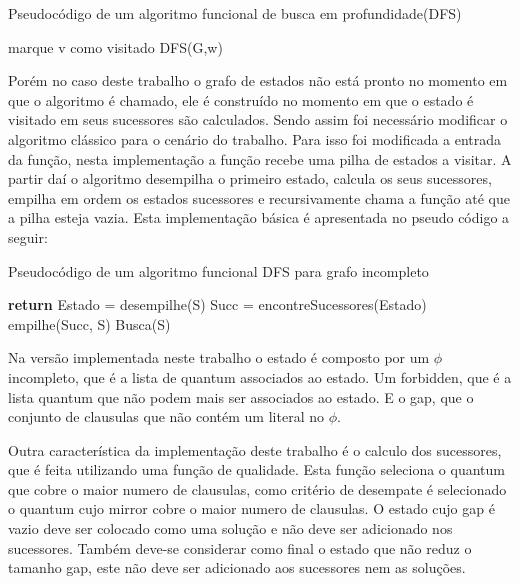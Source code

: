 \documentclass{ufsc-thesis}
\begin{document}
\begin{algorithm}
\caption{Pseudocódigo de um algoritmo funcional de busca em profundidade(DFS)} \label{alg:dfs}
\begin{algorithmic}[1]
\State marque v como visitado
    \State DFS(G,w)
  \EndIf
\EndFor
\EndProcedure
\end{algorithmic}
\end{algorithm}

Porém no caso deste trabalho o grafo de estados não está pronto no momento em que o algoritmo é chamado,
ele é construído no momento em que o estado é visitado em seus sucessores são calculados. Sendo assim 
foi necessário modificar o algoritmo clássico para o cenário do trabalho. Para isso foi modificada a 
entrada da função, nesta implementação a função recebe uma pilha de estados a visitar. A partir daí 
o algoritmo desempilha o primeiro estado, calcula os seus sucessores, empilha em ordem os estados 
sucessores e recursivamente chama a função até que a pilha esteja vazia. Esta implementação básica 
é apresentada no pseudo código a seguir:

\begin{algorithm}
\caption{Pseudocódigo de um algoritmo funcional DFS para grafo incompleto} \label{alg:dfs-incomplete}
\begin{algorithmic}[1]
\State \textbf{return}
\Else
  \State Estado = desempilhe(S)
  \State Succ = encontreSucessores(Estado)
  \State empilhe(Succ, S)
  \State Busca(S)
\EndIf
\EndProcedure
\end{algorithmic}
\end{algorithm}

Na versão implementada neste trabalho o estado é composto por um $\phi$ incompleto, que é a lista 
de quantum associados ao estado. Um forbidden, que é a lista quantum que não podem mais ser associados 
ao estado. E o gap, que o conjunto de clausulas que não contém um literal no $\phi$.

Outra característica da implementação deste trabalho é o calculo dos sucessores, que é feita utilizando 
uma função de qualidade. Esta função seleciona o quantum que cobre o maior numero de clausulas, como 
critério de desempate é selecionado o quantum cujo mirror cobre o maior numero de clausulas. O estado cujo 
gap é vazio deve ser colocado como uma solução e não deve ser adicionado nos sucessores. Também deve-se 
considerar como final o estado que não reduz o tamanho gap, este não deve ser adicionado aos sucessores 
nem as soluções.
\end{document}
